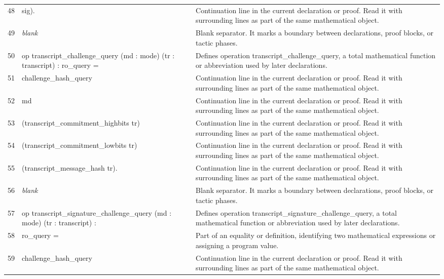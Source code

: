 \documentclass[10pt]{article}
\begin{document}
\begin{longtable}{r L{0.53\textwidth} L{0.37\textwidth}}
48 & {\ttfamily\scriptsize      sig).} & Continuation line in the current declaration or proof.  Read it with surrounding lines as part of the same mathematical object. \\
49 & {\ttfamily\scriptsize \emph{blank}} & Blank separator.  It marks a boundary between declarations, proof blocks, or tactic phases. \\
50 & {\ttfamily\scriptsize op transcript\_challenge\_query (md : mode) (tr : transcript) : ro\_query =} & Defines operation transcript\_challenge\_query, a total mathematical function or abbreviation used by later declarations. \\
51 & {\ttfamily\scriptsize   challenge\_hash\_query} & Continuation line in the current declaration or proof.  Read it with surrounding lines as part of the same mathematical object. \\
52 & {\ttfamily\scriptsize     md} & Continuation line in the current declaration or proof.  Read it with surrounding lines as part of the same mathematical object. \\
53 & {\ttfamily\scriptsize     (transcript\_commitment\_highbits tr)} & Continuation line in the current declaration or proof.  Read it with surrounding lines as part of the same mathematical object. \\
54 & {\ttfamily\scriptsize     (transcript\_commitment\_lowbits tr)} & Continuation line in the current declaration or proof.  Read it with surrounding lines as part of the same mathematical object. \\
55 & {\ttfamily\scriptsize     (transcript\_message\_hash tr).} & Continuation line in the current declaration or proof.  Read it with surrounding lines as part of the same mathematical object. \\
56 & {\ttfamily\scriptsize \emph{blank}} & Blank separator.  It marks a boundary between declarations, proof blocks, or tactic phases. \\
57 & {\ttfamily\scriptsize op transcript\_signature\_challenge\_query (md : mode) (tr : transcript) :} & Defines operation transcript\_signature\_challenge\_query, a total mathematical function or abbreviation used by later declarations. \\
58 & {\ttfamily\scriptsize   ro\_query =} & Part of an equality or definition, identifying two mathematical expressions or assigning a program value. \\
59 & {\ttfamily\scriptsize   challenge\_hash\_query} & Continuation line in the current declaration or proof.  Read it with surrounding lines as part of the same mathematical object. \\

\end{longtable}
\end{document}
